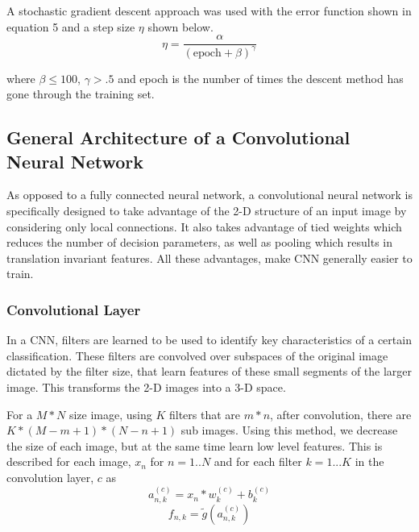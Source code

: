 \documentclass[12pt, twocolumn]{article}
\begin{document}
A stochastic gradient descent approach was used with the error function shown in equation 5 and a step size $\eta$ shown below.
\begin{equation}
\eta = \frac{ \alpha}{ (\textrm{epoch} + \beta)^\gamma}
\end{equation}

where $\beta \leq 100$, $\gamma >.5$ and epoch is the number of times the descent method has gone through the training set.  
\newline\newline



\subsection{General Architecture of a Convolutional Neural Network}
As opposed to a fully connected neural network, a convolutional neural network is specifically designed to take advantage of the 2-D structure of an input image by considering only local connections. It also takes advantage of tied weights which reduces the number of decision parameters, as well as pooling which results in translation invariant features. All these advantages, make CNN generally easier to train. 



\subsubsection{Convolutional Layer}
In a CNN, filters are learned to be used to identify key characteristics of a certain classification. These filters are convolved over subspaces of the original image dictated by the filter size, that learn features of these small segments of the larger image.  This transforms the 2-D images into a 3-D space.

 For a  $M * N $ size image, using $K$ filters that are $m * n$,  after convolution, there are  $ K * (M - m + 1) * (N - n + 1) $ sub images. Using this method, we decrease the size of each image, but at the same time learn low level features. This is described for each image, $x_n$ for $n=1..N$ and for each filter $k=1...K$ in the convolution layer, $c$ as
\begin{equation}
a_{n,k}^{(c)}= x_n \ast w_k^{(c)} + b_k^{(c)}
\end{equation}
\begin{equation}
f_{n,k}= \tilde{g}(a_{n,k}^{(c)})
\end{equation}
 
\end{document}
